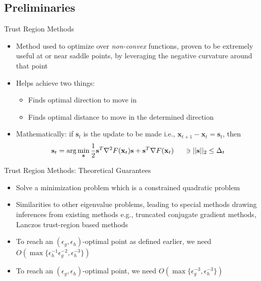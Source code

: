 \documentclass{beamer}
\newcommand{\h}{\nabla^{2}}
\newcommand{\g}{\nabla}
\newcommand{\xbold}{\mathbf{x}}
\newcommand{\sbold}{\mathbf{s}}
\begin{document}
\subsection{Preliminaries}
\begin{frame}{Trust Region Methods}
\begin{itemize}
\item<1->{Method used to optimize over \emph{non-convex} functions, proven to be extremely useful at or near saddle points, by leveraging the negative curvature around that point}
\item<2->{Helps achieve two things:
  \begin{itemize}
    \item<3->Finds optimal direction to move in
    \item<4->Finds optimal distance to move in the determined direction
  \end{itemize}
  }
\item<5->{Mathematically: if \(\sbold_{t}\) is the update to be made i.e., \(\xbold_{t+1} - \xbold_{t} = \sbold_{t}\), then
\begin{equation}
\label{TR}
\sbold_{t} = \text{arg}\min_{\sbold} \frac{1}{2}\sbold^{T} \h F(\xbold_{t}) \sbold + \sbold^{T} \g F(\xbold_{t}) \hspace{5mm}\ni ||\sbold||_{2} \leq \Delta_{t}
\end{equation} %
}
\end{itemize}
\end{frame}

\begin{frame}{Trust Region Methods: Theoretical Guarantees}
\begin{itemize}
\item<1->{Solve a minimization problem which is a constrained quadratic problem}
\item<2->{Similarities to other eigenvalue problems, leading to special methods drawing inferences from existing methods e.g., truncated conjugate gradient methods, Lanczos trust-region based methods}
\item<3->{To reach an \((\epsilon_{g}, \epsilon_{h})\)-optimal point as defined earlier, we need \(O\left(\max\{\epsilon_{h}^{-1}\epsilon_{g}^{-2}, \epsilon_{h}^{-3}\}\right)\)} %
\item<4->{To reach an \((\epsilon_{g}, \epsilon_{h})\)-optimal point, we need \(O\left(\max\{\epsilon_{g}^{-3}, \epsilon_{h}^{-3}\}\right)\)} %
\end{itemize}
\end{frame}
\end{document}
